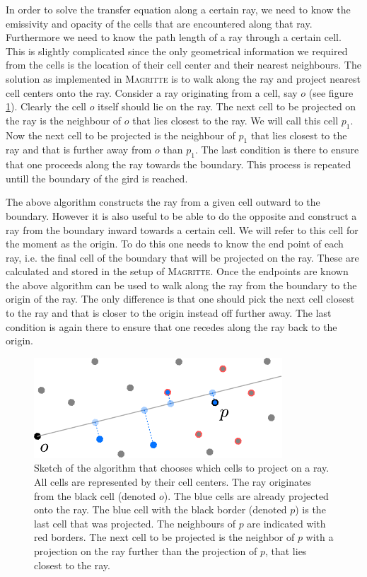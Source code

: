 \documentclass[a4paper,fleqn,usenatbib]{mnras}
\begin{document}
In order to solve the transfer equation along a certain ray, we need to know the emissivity and opacity of the cells that are encountered along that ray. Furthermore we need to know the path length of a ray through a certain cell. This is slightly complicated since the only geometrical information we required from the cells is the location of their cell center and their nearest neighbours. The solution as implemented in \textsc{Magritte} is to walk along the ray and project nearest cell centers onto the ray. Consider a ray originating from a cell, say $o$ (see figure \ref{next_cell}). Clearly the cell $o$ itself should lie on the ray. The next cell to be projected on the ray is the neighbour of $o$ that lies closest to the ray. We will call this cell $p_{1}$. Now the next cell to be projected is the neighbour of $p_{1}$ that lies closest to the ray and that is further away from $o$ than $p_{1}$. The last condition is there to ensure that one proceeds along the ray towards the boundary. This process is repeated untill the boundary of the gird is reached.

The above algorithm constructs the ray from a given cell outward to the boundary. However it is also useful to be able to do the opposite and construct a ray from the boundary inward towards a certain cell. We will refer to this cell for the moment as the origin. To do this one needs to know the end point of each ray, i.e. the final cell of the boundary that will be projected on the ray. These are calculated and stored in the setup of \textsc{Magritte}. Once the endpoints are known the above algorithm can be used to walk along the ray from the boundary to the origin of the ray. The only difference is that one should pick the next cell closest to the ray and that is closer to the origin instead off further away. The last condition is again there to ensure that one recedes along the ray back to the origin.

\begin{figure}
	\centering
	\includegraphics[width=.9\columnwidth]{figures/next_cell.pdf}
  \caption{Sketch of the algorithm that chooses which cells to project on a ray. All cells are represented by their cell centers. The ray originates from the black cell (denoted $o$). The blue cells are already projected onto the ray. The blue cell with the black border (denoted $p$) is the last cell that was projected. The neighbours of $p$ are indicated with red borders. The next cell to be projected is the neighbor of $p$ with a projection on the ray further than the projection of $p$, that lies closest to the ray.}
  \label{next_cell}
\end{figure}
\end{document}

